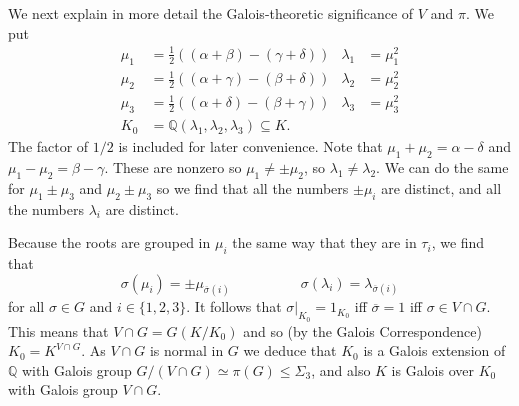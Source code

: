 \documentclass{amsart}
\newcommand{\Q}         {{\mathbb{Q}}}
\newcommand{\al}        {\alpha}
\newcommand{\bt}        {\beta}
\newcommand{\gm}        {\gamma}
\newcommand{\dl}        {\delta}
\newcommand{\lm}        {\lambda}
\newcommand{\sg}        {\sigma}
\newcommand{\Sg}        {\Sigma}
\newcommand{\ov}[1]     {\overline{#1}}
\newcommand{\sse}       {\subseteq}
\renewcommand{\:}{\colon}
\theoremstyle{definition}
\begin{document}
We next explain in more detail the Galois-theoretic significance of
$V$ and $\pi$.  We put 
\begin{align*}
 \mu_1 &= \tfrac{1}{2}((\al+\bt)-(\gm+\dl)) & \lm_1 &= \mu_1^2 \\
 \mu_2 &= \tfrac{1}{2}((\al+\gm)-(\bt+\dl)) & \lm_2 &= \mu_2^2 \\
 \mu_3 &= \tfrac{1}{2}((\al+\dl)-(\bt+\gm)) & \lm_3 &= \mu_3^2 \\
 K_0   &= \Q(\lm_1,\lm_2,\lm_3) \sse K.
\end{align*}
The factor of $1/2$ is included for later convenience.  Note that
$\mu_1+\mu_2=\al-\dl$ and $\mu_1-\mu_2=\bt-\gm$.  These are
nonzero so $\mu_1\neq\pm\mu_2$, so $\lm_1\neq\lm_2$.  We can do the
same for $\mu_1\pm\mu_3$ and $\mu_2\pm\mu_3$ so we find that all the
numbers $\pm\mu_i$ are distinct, and all the numbers $\lm_i$ are
distinct.  

Because the roots are grouped in $\mu_i$ the same way that they are in
$\tau_i$, we find that
\[ \sg(\mu_i) = \pm\mu_{\ov{\sg}(i)}
    \hspace{5em}
   \sg(\lm_i) = \lm_{\ov{\sg}(i)}
\]
for all $\sg\in G$ and $i\in\{1,2,3\}$.  It follows that
$\sg|_{K_0}=1_{K_0}$ iff $\ov{\sg}=1$ iff $\sg\in V\cap G$.  This
means that $V\cap G=G(K/K_0)$ and so (by the Galois Correspondence)
$K_0=K^{V\cap G}$.  As $V\cap G$ is normal in $G$ we deduce that $K_0$
is a Galois extension of $\Q$ with Galois group 
$G/(V\cap G)\simeq\pi(G)\leq\Sg_3$, and also $K$ is Galois over $K_0$
with Galois group $V\cap G$.  
\end{document}
